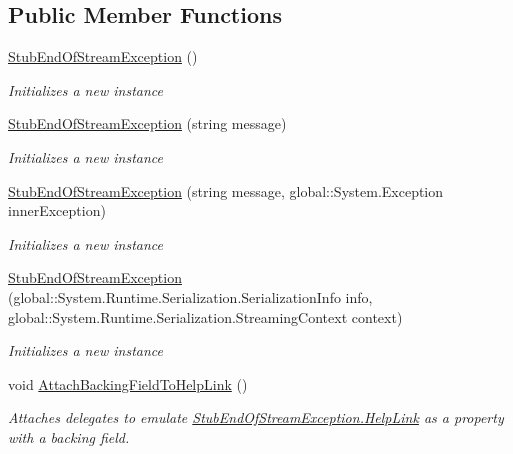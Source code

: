 \subsection*{Public Member Functions}
\begin{DoxyCompactItemize}
\item 
\hyperlink{class_system_1_1_i_o_1_1_fakes_1_1_stub_end_of_stream_exception_a2438af352066ebe05250b7ab6c24525b}{Stub\-End\-Of\-Stream\-Exception} ()
\begin{DoxyCompactList}\small\item\em Initializes a new instance\end{DoxyCompactList}\item 
\hyperlink{class_system_1_1_i_o_1_1_fakes_1_1_stub_end_of_stream_exception_a1c37893bb5141f8966944a6892c2928f}{Stub\-End\-Of\-Stream\-Exception} (string message)
\begin{DoxyCompactList}\small\item\em Initializes a new instance\end{DoxyCompactList}\item 
\hyperlink{class_system_1_1_i_o_1_1_fakes_1_1_stub_end_of_stream_exception_ad8a18faa5063ffcb97b49817106fe1b6}{Stub\-End\-Of\-Stream\-Exception} (string message, global\-::\-System.\-Exception inner\-Exception)
\begin{DoxyCompactList}\small\item\em Initializes a new instance\end{DoxyCompactList}\item 
\hyperlink{class_system_1_1_i_o_1_1_fakes_1_1_stub_end_of_stream_exception_a7572bc192ab208c86c8a37ae3b5e8428}{Stub\-End\-Of\-Stream\-Exception} (global\-::\-System.\-Runtime.\-Serialization.\-Serialization\-Info info, global\-::\-System.\-Runtime.\-Serialization.\-Streaming\-Context context)
\begin{DoxyCompactList}\small\item\em Initializes a new instance\end{DoxyCompactList}\item 
void \hyperlink{class_system_1_1_i_o_1_1_fakes_1_1_stub_end_of_stream_exception_a7638671c89c8286f3902d0914e7d3e9d}{Attach\-Backing\-Field\-To\-Help\-Link} ()
\begin{DoxyCompactList}\small\item\em Attaches delegates to emulate \hyperlink{class_system_1_1_i_o_1_1_fakes_1_1_stub_end_of_stream_exception_ad3cffd314e73a07fcc954a563ce59bf4}{Stub\-End\-Of\-Stream\-Exception.\-Help\-Link} as a property with a backing field.\end{DoxyCompactList}\item 

\end{DoxyCompactItemize}

